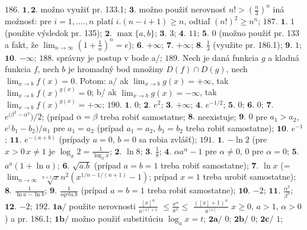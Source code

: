 $\boxed{186.}$ $\boldsymbol{1,2.}$ možno využiť pr. 133.1;
$\boldsymbol{3.}$ možno použiť nerovnosť $n!>(\frac{n}{3})^{n} $ iná možnosť: pre $i=1,....,n $ platí $i.(n-i+1)\geq n $, odtiaľ $(n!)^{2}\geq n^{n} $;
$\boxed{187.}$ $\boldsymbol{1.}$  $1 $ (použite výsledok pr. 135);
$\boldsymbol{2.}$  $\max \lbrace a,b \rbrace $;
$\boldsymbol{3.}$  $3 $;
$\boldsymbol{4.}$  $11 $;
$\boldsymbol{5.}$  $0 $ (možno použiť pr. 133 a fakt, že $\lim_{n \to \infty}(1+ \frac{1}{n})^{n}=e $);
$\boldsymbol{6.}$  $+\infty $;
$\boldsymbol{7.}$  $+\infty $;
$\boldsymbol{8.}$  $\frac{1}{3} $ (využite pr. 186.1);
$\boldsymbol{9.}$  $1$;
$\boldsymbol{10.}$  $-\infty $;
$\boxed{188.}$ správny je postup v bode a/;
$\boxed{189.}$ Nech je daná funkcia $g$ a kladná funkcia $f$, nech $b$ je hromadný bod množiny $D(f)\cap D(g)$, nech $\lim_{x \to b} f(x)=0$. Potom: a/ ak $\lim_{x \to b} g(x)=+\infty$, tak $\lim_{x \to b} f(x)^{g(x)}=0$; b/ ak $\lim_{x \to b} g(x)=-\infty$, tak $\lim_{x \to b} f(x)^{g(x)}=+\infty$;
$\boxed{190.}$ $\boldsymbol{1.}$  $0$;
$\boldsymbol{2.}$  $e^{2}$;
$\boldsymbol{3.}$  $+\infty$;
$\boldsymbol{4.}$  $e^{-1/2}$;
$\boldsymbol{5.}$  $0$;
$\boldsymbol{6.}$  $0$;
$\boldsymbol{7.}$  $e^{(\beta^{2}-\alpha^{2}})/2$; (prípad $\alpha=\beta$ treba robiť samostatne;
$\boldsymbol{8.}$ neexistuje;
$\boldsymbol{9.}$  $0$ pre $a_{1}>a_{2}$, $e^({b_{1}-b_{2})/a_{1}}$ pre $a_{1}=a_{2}$ (prípad $a_{1}=a_{2}$, $b_{1}=b_{2}$ treba robiť samostatne);
$\boldsymbol{10.}$  $e^{-1}$;
$\boldsymbol{11.}$  $e^{-(a+b)}$ (prípady $a=0,\, b=0$ sa robia zvlášť);
$\boxed{191.}$ $\boldsymbol{1.}$  $- \ln 2$ (pre $x>0 \, x\ne 1$ je $\log_{x}2= \frac{1}{\log_{2}x}$;
$\boldsymbol{2.}$  $\ln 8$;
$\boldsymbol{3.}$  $\frac{1}{8}$;
$\boldsymbol{4.}$  $\alpha a^{\alpha}-1$ pre $\alpha\ne 0$, $0$ pre $\alpha=0$;
$\boldsymbol{5.}$  $a^{a}(1+\ln a)$;
$\boldsymbol{6.}$  $\sqrt{a.b}$ (prípad $a=b=1$ treba robiť samostatne);
$\boldsymbol{7.}$  $\ln x$ (= $\lim_{n \to \infty}\sqrt[n+1]{x}n^{2}(x^{1/n-1/(n+1)}-1)$; prípad $x=1$ treba urobiť samostatne);
$\boldsymbol{8.}$  $\frac{1}{\ln a - \ln b}$;
$\boldsymbol{9.}$  $\frac{1}{sqrt{a.b}}$ (prípad $a=b=1$ treba robiť samostatne);
$\boldsymbol{10.}$  $-2$;
$\boldsymbol{11.}$  $\frac{\alpha^{2}}{\beta ^{2}}$;
$\boldsymbol{12.}$  $-2$;
$\boxed{192.}$ $\boldsymbol{1a/}$  použite nerovnosti $\frac{[x]^{\alpha}}{a^{[x]+1}}$ $\leq \frac{x^{\alpha}}{a^{x}}\leq$ $\frac{([x]+1)^{\alpha}}{a^{[x]}}$ $x\geq0, \, a>1, \, \alpha >0$) a pr. 186.1;
$\boldsymbol{1b/}$  možno použiť substitúciu  $\log_{a}x=t$;
$\boldsymbol{2a/}$   $0$;
$\boldsymbol{2b/}$   $0$; 
$\boldsymbol{2c/}$   $1$;  

